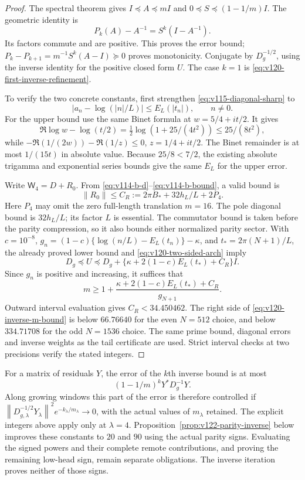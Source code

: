 \documentclass[11pt]{article}
\theoremstyle{remark}
\newcommand{\norm}[1]{\left\lVert #1\right\rVert}
\begin{document}
\begin{proof}
The spectral theorem gives $I\preceq A\preceq mI$ and
$0\preceq S\preceq(1-1/m)I$. The geometric identity is
\[
 P_k(A)-A^{-1}=S^k(I-A^{-1}).
\]
Its factors commute and are positive. This proves the error bound;
$P_k-P_{k+1}=m^{-1}S^k(A-I)\succeq0$ proves monotonicity.
Conjugate by $D_g^{-1/2}$, using the inverse identity for the
positive closed form $U$. The case $k=1$ is
\eqref{eq:v120-first-inverse-refinement}.

To verify the two concrete constants, first strengthen
\eqref{eq:v115-diagonal-sharp} to
\begin{equation}\label{eq:v120-two-sided-arch}
 |a_n-\log(|n|/L)|\le E_L(|t_n|),\qquad n\ne0.
\end{equation}
For the upper bound use the same Binet formula at
$w=5/4+it/2$. It gives
\[
 \Re\log w-\log(t/2)
 =\tfrac12\log(1+25/(4t^2))\le25/(8t^2),
\]
while $-\Re(1/(2w))-\Re(1/z)\le0$, $z=1/4+it/2$.
The Binet remainder is at most $1/(15t)$ in absolute value.
Because $25/8<7/2$, the existing absolute trigamma and exponential
series bounds give the same $E_L$ for the upper error.

Write $\mathsf W_4=D+R_0$. From
\eqref{eq:v114-b-d}--\eqref{eq:v114-b-bound}, a valid bound is
\[
 \norm{R_0}\le C_R:=2\pi B_*+32h_L/L+2P_4.
\]
Here $P_4$ may omit the zero full-length translation $m=16$.
The pole diagonal bound is $32h_L/L$; its factor $L$ is essential.
The commutator bound is taken before the parity compression, so it
also bounds either normalized parity sector. With $c=10^{-8}$,
$g_n=(1-c)\{\log(n/L)-E_L(t_n)\}-\kappa$, and
$t_*=2\pi(N+1)/L$, the already proved lower bound and
\eqref{eq:v120-two-sided-arch} imply
\[
 D_g\preceq U\preceq
 D_g+\{\kappa+2(1-c)E_L(t_*)+C_R\}I.
\]
Since $g_n$ is positive and increasing, it suffices that
\begin{equation}\label{eq:v120-inverse-m-bound}
 m\ge1+\frac{\kappa+2(1-c)E_L(t_*)+C_R}{g_{N+1}}.
\end{equation}
Outward interval evaluation gives $C_R<34.450462$. The right side
of \eqref{eq:v120-inverse-m-bound} is below $66.76640$ for the
even $N=512$ choice, and below $334.71708$ for the odd $N=1536$
choice. The same prime bound, diagonal errors and inverse weights
as the tail certificate are used. Strict interval checks at two
precisions verify the stated integers.
\end{proof}

For a matrix of residuals $Y$, the error of the $k$th inverse bound
is at most
\[
 (1-1/m)^k Y^*D_g^{-1}Y.
\]
Along growing windows this part of the error is therefore controlled
if $\norm{D_{g,\lambda}^{-1/2}Y_\lambda}^2
 e^{-k_\lambda/m_\lambda}\to0$, with the actual values of
$m_\lambda$ retained. The explicit integers above apply only at
$\lambda=4$. Proposition~\ref{prop:v122-parity-inverse} below improves these
constants to $20$ and $90$ using the actual parity signs. Evaluating
the signed powers and their complete remote contributions, and
proving the remaining low-head sign, remain separate obligations. The inverse iteration proves neither of those signs.
\end{document}
